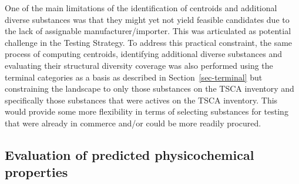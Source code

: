 \documentclass[
  super,
  preprint,
  3p]{elsarticle}
\begin{document}
One of the main limitations of the identification of centroids and
additional diverse substances was that they might yet not yield feasible
candidates due to the lack of assignable manufacturer/importer. This was
articulated as potential challenge in the Testing Strategy. To address
this practical constraint, the same process of computing centroids,
identifying additional diverse substances and evaluating their
structural diversity coverage was also performed using the terminal
categories as a basis as described in Section~\ref{sec-terminal} but
constraining the landscape to only those substances on the TSCA
inventory and specifically those substances that were actives on the
TSCA inventory. This would provide some more flexibility in terms of
selecting substances for testing that were already in commerce and/or
could be more readily procured.

\hypertarget{sec-physchem}{%
\subsection{Evaluation of predicted physicochemical
properties}\label{sec-physchem}}
\end{document}
